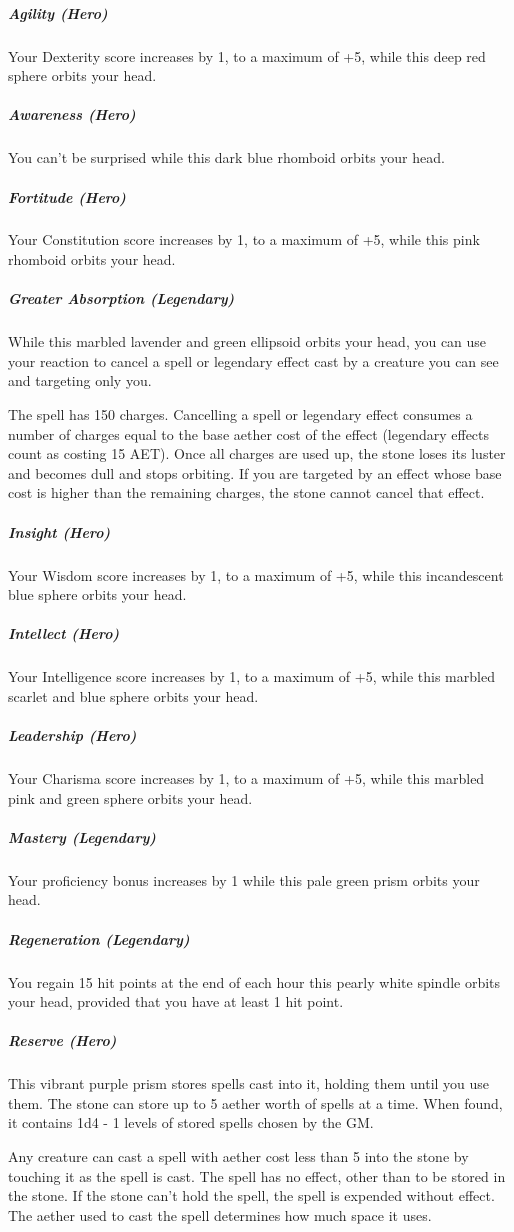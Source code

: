 \subparagraph*{Agility (Hero)} Your Dexterity score increases by 1, to a maximum of +5, while this deep red sphere orbits your head.

\subparagraph*{Awareness (Hero)} You can't be surprised while this dark blue rhomboid orbits your head.

\subparagraph*{Fortitude (Hero)} Your Constitution score increases by 1, to a maximum of +5, while this pink rhomboid orbits your head.

\subparagraph*{Greater Absorption (Legendary)} While this marbled lavender and green ellipsoid orbits your head, you can use your reaction to cancel a spell or legendary effect cast by a creature you can see and targeting only you.

The spell has 150 charges. Cancelling a spell or legendary effect consumes a number of charges equal to the base aether cost of the effect (legendary effects count as costing 15 AET). Once all charges are used up, the stone loses its luster and becomes dull and stops orbiting. If you are targeted by an effect whose base cost is higher than the remaining charges, the stone cannot cancel that effect.

\subparagraph*{Insight (Hero)} Your Wisdom score increases by 1, to a maximum of +5, while this incandescent blue sphere orbits your head.

\subparagraph*{Intellect (Hero)} Your Intelligence score increases by 1, to a maximum of +5, while this marbled scarlet and blue sphere orbits your head.

\subparagraph*{Leadership (Hero)} Your Charisma score increases by 1, to a maximum of +5, while this marbled pink and green sphere orbits your head.

\subparagraph*{Mastery (Legendary)} Your proficiency bonus increases by 1 while this pale green prism orbits your head.

\subparagraph*{Regeneration (Legendary)} You regain 15 hit points at the end of each hour this pearly white spindle orbits your head, provided that you have at least 1 hit point.

\subparagraph*{Reserve (Hero)} This vibrant purple prism stores spells cast into it, holding them until you use them. The stone can store up to 5 aether worth of spells at a time. When found, it contains 1d4 - 1 levels of stored spells chosen by the GM.

Any creature can cast a spell with aether cost less than 5 into the stone by touching it as the spell is cast. The spell has no effect, other than to be stored in the stone. If the stone can't hold the spell, the spell is expended without effect. The aether used to cast the spell determines how much space it uses.

